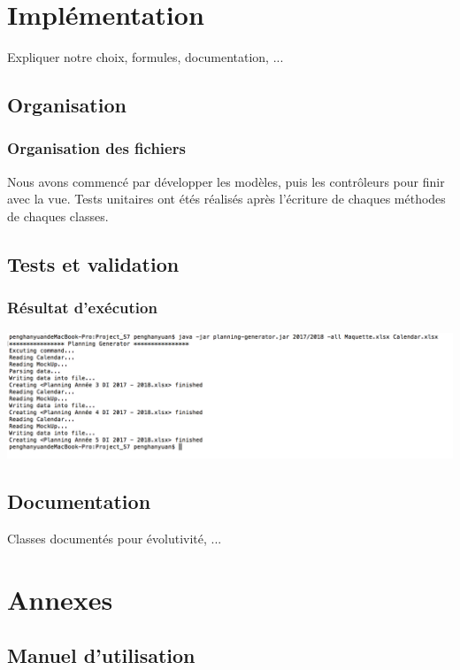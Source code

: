 \documentclass{polytech/polytech}
\begin{document}
	\chapter{Implémentation}

	Expliquer notre choix, formules, documentation, ...

	\section{Organisation}

	\subsection{Organisation des fichiers}

	Nous avons commencé par développer les modèles, puis les contrôleurs pour finir avec la vue.
	Tests unitaires ont étés réalisés après l'écriture de chaques méthodes de chaques classes.

	\section{Tests et validation}
	\subsection{Résultat d'exécution}
	\includegraphics[width=\textwidth]{./img/excution_result.png}
	\section{Documentation}

	Classes documentés pour évolutivité, ...

	\chapter{Annexes}

	\section{Manuel d'utilisation}
	
\end{document}
